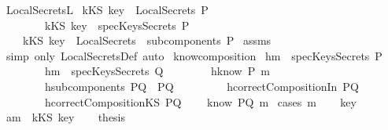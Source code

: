 \begin{isabellebody}
\endisatagproof
{\isafoldproof}%
%
\isadelimproof
\isanewline
%
\endisadelimproof
\isanewline
{}\isamarkupfalse%
\ LocalSecrets{\isacharunderscore}L{}{\isacharcolon}\isanewline
{}\ {\isachardoublequoteopen}kKS\ key\ {\isasymin}\ LocalSecrets\ P{\isachardoublequoteclose}\ \ \isanewline
\ \ \ \ \ \ \ \ {\isachardoublequoteopen}kKS\ key\ {\isasymin}\ specKeysSecrets\ P{\isachardoublequoteclose}\isanewline
{}\ \ \ \ {\isachardoublequoteopen}kKS\ key\ {\isasymin}\ {\isasymUnion}{\isacharparenleft}LocalSecrets\ {\isacharbackquote}\ subcomponents\ P{\isacharparenright}{\isachardoublequoteclose}\isanewline
%
\isadelimproof
%
\endisadelimproof
%
\isatagproof
{}\isamarkupfalse%
\ assms\ \isamarkupfalse%
\ {\isacharparenleft}simp\ only{\isacharcolon}\ LocalSecretsDef{\isacharcomma}\ auto{\isacharparenright}%
\endisatagproof
{\isafoldproof}%
%
\isadelimproof
\isanewline
%
\endisadelimproof
\isanewline
{}\isamarkupfalse%
\ know{\isacharunderscore}composition{}{\isacharcolon}\isanewline
{}\ h{}{\isacharcolon}{\isachardoublequoteopen}m\ {\isasymnotin}\ specKeysSecrets\ P{\isachardoublequoteclose}\isanewline
\ \ \ \ \ \ \ \ h{}{\isacharcolon}{\isachardoublequoteopen}m\ {\isasymnotin}\ specKeysSecrets\ Q{\isachardoublequoteclose}\isanewline
\ \ \ \ \ \ \ \ h{}{\isacharcolon}{\isachardoublequoteopen}know\ P\ m{\isachardoublequoteclose}\isanewline
\ \ \ \ \ \ \ \ h{}{\isacharcolon}{\isachardoublequoteopen}subcomponents\ PQ\ {\isacharequal}\ {\isacharbraceleft}P{\isacharcomma}Q{\isacharbraceright}{\isachardoublequoteclose}\ \isanewline
\ \ \ \ \ \ \ \ h{}{\isacharcolon}{\isachardoublequoteopen}correctCompositionIn\ PQ{\isachardoublequoteclose}\isanewline
\ \ \ \ \ \ \ \ h{}{\isacharcolon}{\isachardoublequoteopen}correctCompositionKS\ PQ{\isachardoublequoteclose}\isanewline
{}\ \ \ \ {\isachardoublequoteopen}know\ PQ\ m{\isachardoublequoteclose}\isanewline
%
\isadelimproof
%
\endisadelimproof
%
\isatagproof
{}\isamarkupfalse%
\ {\isacharparenleft}cases\ m{\isacharparenright}\isanewline
\ \ \isamarkupfalse%
\ key\isanewline
\ \ \isamarkupfalse%
\ a{}{\isacharcolon}{\isachardoublequoteopen}m\ {\isacharequal}\ kKS\ key{\isachardoublequoteclose}\isanewline
\ \ \isamarkupfalse%
\ {\isacharquery}thesis\isanewline

\end{isabellebody}
